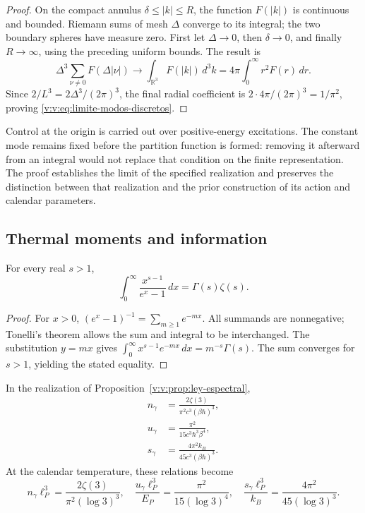 \begin{proof}
On the compact annulus \(\delta\leq|k|\leq R\), the function
\(F(|k|)\) is continuous and bounded. Riemann sums of mesh
\(\Delta\) converge to its integral; the two boundary spheres
have measure zero. First let \(\Delta\to0\), then
\(\delta\to0\), and finally \(R\to\infty\), using the preceding
uniform bounds. The result is
\[
 \Delta^3\sum_{\nu\ne0}F(\Delta|\nu|)
 \longrightarrow \int_{\mathbb R^3}F(|k|)\,d^3k
 =4\pi\int_0^\infty r^2F(r)\,dr.
\]
Since \(2/L^3=2\Delta^3/(2\pi)^3\), the final radial coefficient
is \(2\cdot4\pi/(2\pi)^3=1/\pi^2\), proving
\eqref{v:v:eq:limite-modos-discretos}.
\end{proof}

Control at the origin is carried out over positive-energy excitations.
The constant mode remains fixed before the partition function is formed:
removing it afterward from an integral would not replace that condition on
the finite representation. The proof establishes the limit of the
specified realization and preserves the distinction between that realization and
the prior construction of its action and calendar parameters.



\subsection{Thermal moments and information}

\begin{lemma}
\label{v:v:lem:momento-bosonico}
For every real \(s>1\),
\begin{equation}
 \int_0^\infty\frac{x^{s-1}}{e^x-1}\,dx
 =\Gamma(s)\zeta(s).
 \label{v:v:eq:momento-bosonico}
\end{equation}
\end{lemma}
\begin{proof}
For \(x>0\), \((e^x-1)^{-1}=\sum_{m\geq1}e^{-mx}\).
All summands are nonnegative; Tonelli's theorem allows the sum
and integral to be interchanged. The substitution \(y=mx\) gives
\(\int_0^\infty x^{s-1}e^{-mx}\,dx=m^{-s}\Gamma(s)\).
The sum converges for \(s>1\), yielding the stated equality.
\end{proof}

\begin{proposition}
\label{v:v:prop:densidades-termicas}
In the realization of Proposition~\ref{v:v:prop:ley-espectral},
\begin{align}
 n_\gamma&=\frac{2\zeta(3)}{\pi^2c^3(\beta\hbar)^3},\\
 u_\gamma&=\frac{\pi^2}{15c^3\hbar^3\beta^4},\\
 s_\gamma&=\frac{4\pi^2 k_B}{45c^3(\beta\hbar)^3}.
 \label{v:v:eq:densidades-termicas}
\end{align}
At the calendar temperature, these relations become
\begin{equation}
 n_\gamma\ell_P^3=\frac{2\zeta(3)}{\pi^2(\log3)^3},\quad
 \frac{u_\gamma\ell_P^3}{E_P}=\frac{\pi^2}{15(\log3)^4},\quad
 \frac{s_\gamma\ell_P^3}{k_B}=\frac{4\pi^2}{45(\log3)^3}.
 \label{v:v:eq:densidades-calendario}
\end{equation}
\end{proposition}


